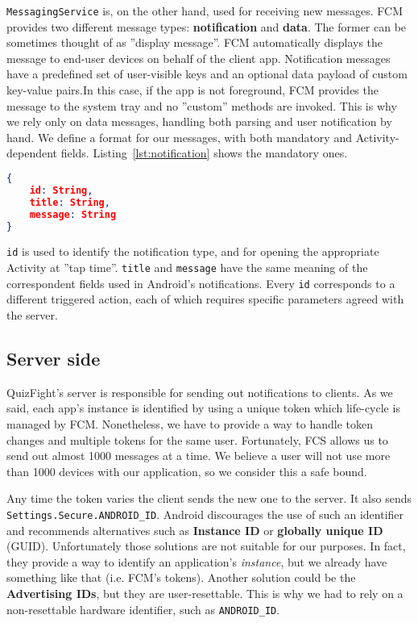 \texttt{MessagingService} is, on the other hand, used for receiving new messages. FCM provides two different message types: \textbf{notification} and \textbf{data}. The former can be sometimes thought of as ''display message''. FCM automatically displays the message to end-user devices on behalf of the client app. Notification messages have a predefined set of user-visible keys and an optional data payload of custom key-value pairs.In this case, if the app is not foreground, FCM provides the message to the system tray and no ''custom'' methods are invoked. This is why we rely only on data messages, handling both parsing and user notification by hand. We define a format for our messages, with both mandatory and Activity-dependent fields. Listing~\ref{lst:notification} shows the mandatory ones.
\begin{lstlisting}[language=json, caption={Mandatory fields for a notification}, label={lst:notification}]
{
	id: String,
	title: String,
	message: String
}
\end{lstlisting}
\texttt{id} is used to identify the notification type, and for opening the appropriate Activity at ''tap time''. \texttt{title} and \texttt{message} have the same meaning of the correspondent fields used in Android's notifications. Every \texttt{id} corresponds to a different triggered action, each of which requires specific parameters agreed with the server.

\subsection{Server side}
QuizFight's server is responsible for sending out notifications to clients. As we said, each app's instance is identified by using a unique token which life-cycle is managed by FCM. Nonetheless, we have to provide a way to handle token changes and multiple tokens for the same user. Fortunately, FCS allows us to send out almost 1000 messages at a time. We believe a user will not use more than 1000 devices with our application, so we consider this a safe bound.

Any time the token varies the client sends the new one to the server. It also sends \texttt{Settings.Secure.ANDROID\_ID}. Android discourages the use of such an identifier and recommends alternatives such as \textbf{Instance ID} or \textbf{globally unique ID} (GUID). Unfortunately those solutions are not suitable for our purposes. In fact, they provide a way to identify an application's \textit{instance}, but we already have something like that (i.e. FCM's tokens). Another solution could be the \textbf{Advertising IDs}, but they are user-resettable. This is why we had to rely on a non-resettable hardware identifier, such as \texttt{ANDROID\_ID}.


